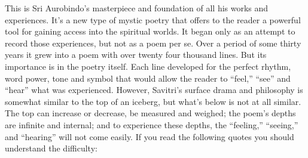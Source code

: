 \documentclass[12pt,a4paper]{book}
\begin{document}
This is Sri Aurobindo's masterpiece and foundation of all his works
and experiences.  It's a new type of mystic poetry that offers to the
reader a powerful tool for gaining access into the spiritual worlds.
It began only as an attempt to record those experiences, but not as a
poem per se. Over a period of some thirty years it grew into a poem
with over twenty four thousand lines. But its importance is in the
poetry itself. Each line developed for the perfect rhythm, word power,
tone and symbol that would allow the reader to ``feel,'' ``see'' and
``hear'' what was experienced. However, Savitri's surface drama and
philosophy is somewhat similar to the top of an iceberg, but what's
below is not at all similar. The top can increase or decrease, be
measured and weighed; the poem's depths are infinite and internal; and
to experience these depths, the ``feeling,'' ``seeing,'' and
``hearing'' will not come easily. If you read the following quotes you
should understand the difficulty:
\end{document}
